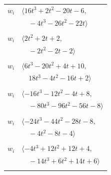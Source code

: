 \documentclass[11pt]{article}
\begin{document}
\begin{longtable}{@{}ll@{}}
$w_i$ & $\langle 16t^{3}+2t^{2}-20t-6,$\\
 & $\quad -4t^{3}-26t^{2}-22t\rangle$\\
\addlinespace[2pt]
\multicolumn{2}{@{}p{0.97\textwidth}@{}}{$i=28$, $D_i=2$, $\rho_{ij}$: $5{:}1, \allowbreak 21{:}1, \allowbreak 29{:}2, \allowbreak 38{:}1, \allowbreak 45{:}1, \allowbreak 48{:}1, \allowbreak 49{:}1$}\\
$w_i$ & $\langle 2t^{2}+2t+2,$\\
 & $\quad -2t^{2}-2t-2\rangle$\\
\addlinespace[2pt]
\multicolumn{2}{@{}p{0.97\textwidth}@{}}{$i=29$, $D_i=2$, $\rho_{ij}$: $0{:}1, \allowbreak 14{:}1, \allowbreak 18{:}1, \allowbreak 25{:}2, \allowbreak 28{:}1, \allowbreak 30{:}2, \allowbreak 36{:}2, \allowbreak 38{:}1, \allowbreak 49{:}1, \allowbreak 50{:}2$}\\
$w_i$ & $\langle 6t^{3}-20t^{2}+4t+10,$\\
 & $\quad 18t^{3}-4t^{2}-16t+2\rangle$\\
\addlinespace[2pt]
\multicolumn{2}{@{}p{0.97\textwidth}@{}}{$i=30$, $D_i=4$, $\rho_{ij}$: $3{:}2, \allowbreak 14{:}1, \allowbreak 20{:}2, \allowbreak 21{:}1, \allowbreak 29{:}1, \allowbreak 31{:}2, \allowbreak 35{:}2, \allowbreak 41{:}1$}\\
$w_i$ & $\langle -16t^{3}-12t^{2}-4t+8,$\\
 & $\quad -80t^{3}-96t^{2}-56t-8\rangle$\\
\addlinespace[2pt]
\multicolumn{2}{@{}p{0.97\textwidth}@{}}{$i=31$, $D_i=4$, $\rho_{ij}$: $7{:}1, \allowbreak 13{:}1, \allowbreak 21{:}1, \allowbreak 27{:}2, \allowbreak 30{:}1, \allowbreak 32{:}1, \allowbreak 34{:}2, \allowbreak 44{:}1$}\\
$w_i$ & $\langle -24t^{3}-44t^{2}-28t-8,$\\
 & $\quad -4t^{2}-8t-4\rangle$\\
\addlinespace[2pt]
\multicolumn{2}{@{}p{0.97\textwidth}@{}}{$i=32$, $D_i=4$, $\rho_{ij}$: $3{:}1, \allowbreak 8{:}2, \allowbreak 9{:}1, \allowbreak 12{:}1, \allowbreak 22{:}2, \allowbreak 24{:}2, \allowbreak 31{:}2, \allowbreak 39{:}1$}\\
$w_i$ & $\langle -4t^{3}+12t^{2}+12t+4,$\\
 & $\quad -14t^{3}+6t^{2}+14t+6\rangle$\\
\addlinespace[2pt]
\multicolumn{2}{@{}p{0.97\textwidth}@{}}{$i=33$, $D_i=4$, $\rho_{ij}$: $7{:}1, \allowbreak 8{:}2, \allowbreak 15{:}2, \allowbreak 18{:}1, \allowbreak 36{:}2, \allowbreak 39{:}2, \allowbreak 46{:}1$}\\

\end{longtable}
\end{document}
